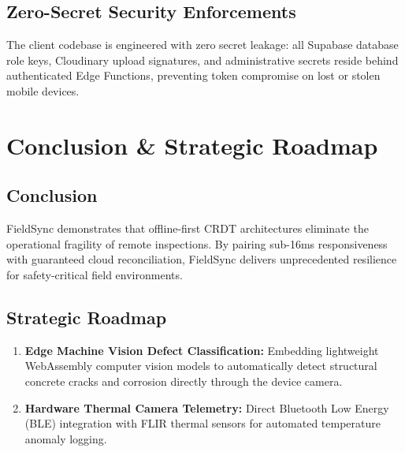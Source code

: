\documentclass[12pt,a4paper]{report}
\begin{document}
\section{Zero-Secret Security Enforcements}
The client codebase is engineered with zero secret leakage: all Supabase database role keys, Cloudinary upload signatures, and administrative secrets reside behind authenticated Edge Functions, preventing token compromise on lost or stolen mobile devices.

\chapter{Conclusion \& Strategic Roadmap}

\section{Conclusion}
FieldSync demonstrates that offline-first CRDT architectures eliminate the operational fragility of remote inspections. By pairing sub-16ms responsiveness with guaranteed cloud reconciliation, FieldSync delivers unprecedented resilience for safety-critical field environments.

\section{Strategic Roadmap}
\begin{enumerate}[nosep]
    \item \textbf{Edge Machine Vision Defect Classification:} Embedding lightweight WebAssembly computer vision models to automatically detect structural concrete cracks and corrosion directly through the device camera.
    \item \textbf{Hardware Thermal Camera Telemetry:} Direct Bluetooth Low Energy (BLE) integration with FLIR thermal sensors for automated temperature anomaly logging.
\end{enumerate}
\end{document}
